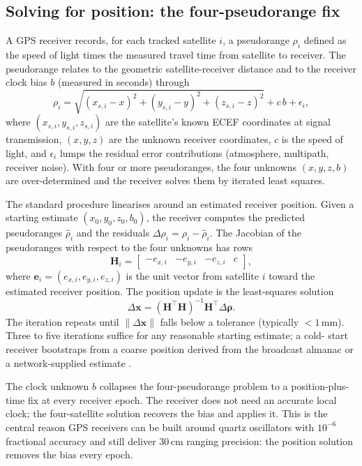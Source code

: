 \subsection{Solving for position: the four-pseudorange fix}

A GPS receiver records, for each tracked satellite $i$, a
pseudorange $\rho_{i}$ defined as the speed of light times the
measured travel time from satellite to receiver. The pseudorange
relates to the geometric satellite-receiver distance and to the
receiver clock bias $b$ (measured in seconds) through
\[
\rho_{i} = \sqrt{(x_{s,i} - x)^{2} + (y_{s,i} - y)^{2} + (z_{s,i} - z)^{2}}
+ c\,b + \epsilon_{i},
\]
where $(x_{s,i}, y_{s,i}, z_{s,i})$ are the satellite's known
ECEF coordinates at signal transmission, $(x, y, z)$ are the
unknown receiver coordinates, $c$ is the speed of light, and
$\epsilon_{i}$ lumps the residual error contributions (atmosphere,
multipath, receiver noise). With four or more pseudoranges, the
four unknowns $(x, y, z, b)$ are over-determined and the receiver
solves them by iterated least squares.

The standard procedure linearises around an estimated receiver
position. Given a starting estimate $(x_{0}, y_{0}, z_{0}, b_{0})$,
the receiver computes the predicted pseudoranges $\hat\rho_{i}$
and the residuals $\Delta \rho_{i} = \rho_{i} - \hat\rho_{i}$. The
Jacobian of the pseudoranges with respect to the four unknowns
has rows
\[
\mathbf{H}_{i} = \begin{bmatrix}
-e_{x,i} & -e_{y,i} & -e_{z,i} & c
\end{bmatrix},
\]
where $\mathbf{e}_{i} = (e_{x,i}, e_{y,i}, e_{z,i})$ is the unit
vector from satellite $i$ toward the estimated receiver position.
The position update is the least-squares solution
\[
\Delta \mathbf{x} = (\mathbf{H}^{\top} \mathbf{H})^{-1}
\mathbf{H}^{\top} \Delta \boldsymbol\rho.
\]
The iteration repeats until $\|\Delta \mathbf{x}\|$ falls below a
tolerance (typically $< 1 \,\si{\milli\meter}$). Three to five
iterations suffice for any reasonable starting estimate; a cold-
start receiver bootstraps from a coarse position derived from the
broadcast almanac or a network-supplied estimate
\cite{text:ch06-misra-enge-2011}.

The clock unknown $b$ collapses the four-pseudorange problem to a
position-plus-time fix at every receiver epoch. The receiver does
not need an accurate local clock; the four-satellite solution
recovers the bias and applies it. This is the central reason GPS
receivers can be built around quartz oscillators with $10^{-6}$
fractional accuracy and still deliver $30 \,\si{\centi\meter}$
ranging precision: the position solution removes the bias every
epoch.

